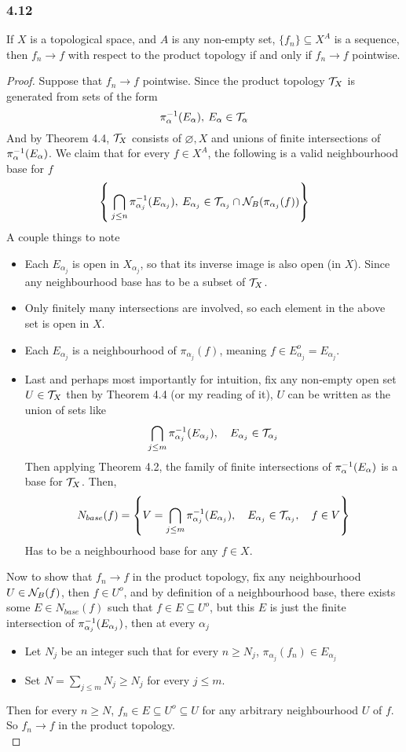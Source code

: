 \documentclass[../../main.tex]{subfiles}
\begin{document}
\subsubsection*{4.12}
\begin{wts}
If $X$ is a topological space, and $A$ is any non-empty set, $\{f_n\}\subseteq X^A$ is a sequence, then $f_n\to f$ with respect to the product topology if and only if $f_n\to f$ pointwise.
\end{wts}
\begin{proof}
    Suppose that $f_n\to f$ pointwise. Since the product topology $\mathcal{T}_X$ is generated from sets of the form
    \[
    \pi_{\alpha}^{-1}({E_\alpha}),\:E_\alpha\in \mathcal{T}_\alpha
    \]
    And by Theorem 4.4, $\mathcal{T}_X$ consists of $\varnothing, X$ and unions of finite intersections of $\pi_{\alpha}^{-1}({E_\alpha})$. We claim that for every $f\in X^A$, the following is a valid neighbourhood base for $f$
    \[
    \left\{\:\bigcap_{j\leq n}\pi^{-1}_{\alpha_j}(E_{\alpha_j}),\:E_{\alpha_j}\in \mathcal{T}_{\alpha_j}\cap\mathcal{N}_B({\pi_{\alpha_j}(f)})\right\}
    \]
    A couple things to note
    \begin{itemize}
        \item Each $E_{\alpha_j}$ is open in $X_{\alpha_j}$, so that its inverse image is also open (in $X$). Since any neighbourhood base has to be a subset of $\mathcal{T}_X$.
        \item Only finitely many intersections are involved, so each element in the above set is open in $X$.
        \item Each $E_{\alpha_j}$ is a neighbourhood of $\pi_{\alpha_j}(f)$, meaning $f\in E_{\alpha_j}^o = E_{\alpha_j}$.
        \item Last and perhaps most importantly for intuition, fix any non-empty open set $U\in \mathcal{T}_X$ then by Theorem 4.4 (or my reading of it), $U$ can be written as the union of sets like
        \[
        \bigcap_{j\leq m}\pi_{\alpha_j}^{-1}({E_{\alpha_j}}),\quad E_{\alpha_j}\in\mathcal{T}_{\alpha_j}
        \]
        Then applying Theorem 4.2, the family of finite intersections of $\pi_{\alpha}^{-1}({E_\alpha})$ is a base for $\mathcal{T}_X$. Then, 
        \[
        N_{base}(f) = \left\{V=\bigcap_{j\leq m}\pi_{\alpha_j}^{-1}({E_{\alpha_j}}),\quad E_{\alpha_j}\in\mathcal{T}_{\alpha_j}, \quad f\in V\right\}
        \]
        Has to be a neighbourhood base for any $f\in X$.
    \end{itemize}
    Now to show that $f_n\to f$ in the product topology, fix any neighbourhood $U\in\mathcal{N}_B({f})$, then $f\in U^o$, and by definition of a neighbourhood base, there exists some $E\in N_{base}(f)$ such that $f\in E\subseteq U^o$, but this $E$ is just the finite intersection of $\pi_{\alpha_j}^{-1}({E_{\alpha_j}})$, then at every $\alpha_j$
    \begin{itemize}
        \item Let $N_j$ be an integer such that for every $n\geq N_j$, $\pi_{\alpha_j}(f_n)\in E_{\alpha_j}$
        \item Set $N = \sum_{j\leq m}N_j\geq N_j$ for every $j\leq m$.
    \end{itemize}
    Then for every $n\geq N$, $f_n\in E\subseteq U^o\subseteq U$ for any arbitrary neighbourhood $U$ of $f$. So $f_n\to f$ in the product topology.\\
    

\end{proof}
\end{document}
